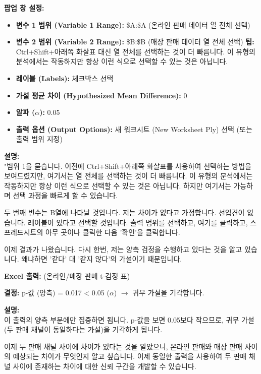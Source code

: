 \documentclass[11pt,a4paper]{article}
\theoremstyle{definition}
\begin{document}
\begin{infobox}[title=온라인/매장 Excel 워크시트 (5/10): t-검정 설정 입력 (열 선택)]
\textbf{팝업 창 설정:}
\begin{itemize}
    \item \textbf{변수 1 범위 (Variable 1 Range):} \$A:\$A (온라인 판매 데이터 열 전체 선택)
    \item \textbf{변수 2 범위 (Variable 2 Range):} \$B:\$B (매장 판매 데이터 열 전체 선택)
    \textbf{팁:} Ctrl+Shift+아래쪽 화살표 대신 열 전체를 선택하는 것이 더 빠릅니다. 이 유형의 분석에서는 작동하지만 항상 이런 식으로 선택할 수 있는 것은 아닙니다.
    \item \textbf{레이블 (Labels):} 체크박스 선택
    \item \textbf{가설 평균 차이 (Hypothesized Mean Difference):} 0
    \item \textbf{알파 ($\alpha$):} 0.05
    \item \textbf{출력 옵션 (Output Options):} 새 워크시트 (New Worksheet Ply) 선택 (또는 출력 범위 지정)
\end{itemize}

\textbf{설명:} \\
"범위 1을 묻습니다. 이전에 Ctrl+Shift+아래쪽 화살표를 사용하여 선택하는 방법을 보여드렸지만, 여기서는 열 전체를 선택하는 것이 더 빠릅니다. 이 유형의 분석에서는 작동하지만 항상 이런 식으로 선택할 수 있는 것은 아닙니다. 하지만 여기서는 가능하며 선택 과정을 빠르게 할 수 있습니다.

두 번째 변수는 B열에 나타날 것입니다. 저는 차이가 없다고 가정합니다. 선입견이 없습니다. 레이블이 있다고 선택할 것입니다. 출력 범위를 선택하고, 여기를 클릭하고, 스프레드시트의 아무 곳이나 클릭한 다음 '확인'을 클릭합니다.

이제 결과가 나왔습니다. 다시 한번, 저는 양측 검정을 수행하고 있다는 것을 알고 있습니다. 왜냐하면 '같다' 대 '같지 않다'의 가설이기 때문입니다.
\end{infobox}

\begin{infobox}[title=온라인/매장 Excel 워크시트 (6/10): 결과 분석 및 결정]
\textbf{Excel 출력:} (온라인/매장 판매 t-검정 표)

\textbf{결정:}
p-값 (양측) = 0.017 < 0.05 ($\alpha$) $\rightarrow$ 귀무 가설을 기각합니다.

\textbf{설명:} \\
이 출력의 양측 부분에만 집중하면 됩니다. p-값을 보면 0.05보다 작으므로, 귀무 가설(두 판매 채널이 동일하다는 가설)을 기각하게 됩니다.

이제 두 판매 채널 사이에 차이가 있다는 것을 알았으니, 온라인 판매와 매장 판매 사이의 예상되는 차이가 무엇인지 알고 싶습니다. 이제 동일한 출력을 사용하여 두 판매 채널 사이에 존재하는 차이에 대한 신뢰 구간을 개발할 수 있습니다.
\end{infobox}
\end{document}
